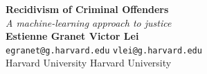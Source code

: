\documentclass[a0,landscape]{a0poster}
\begin{document}


\begin{minipage}[b]{0.55\linewidth}
\veryHuge \color{NavyBlue} \textbf{Recidivism of Criminal Offenders} \color{Black}\\ %
\Huge\textit{A machine-learning approach to justice}\\[1cm] %
\huge \textbf{Estienne Granet \hspace{8.7cm}    Victor Lei}\\ %
\Large \texttt{egranet@g.harvard.edu} \hspace{6cm} \texttt{vlei@g.harvard.edu}\\ %
\Large Harvard University \hspace{12.3cm} Harvard University\\ %
\end{minipage}


\vspace{1cm} %

\end{document}
